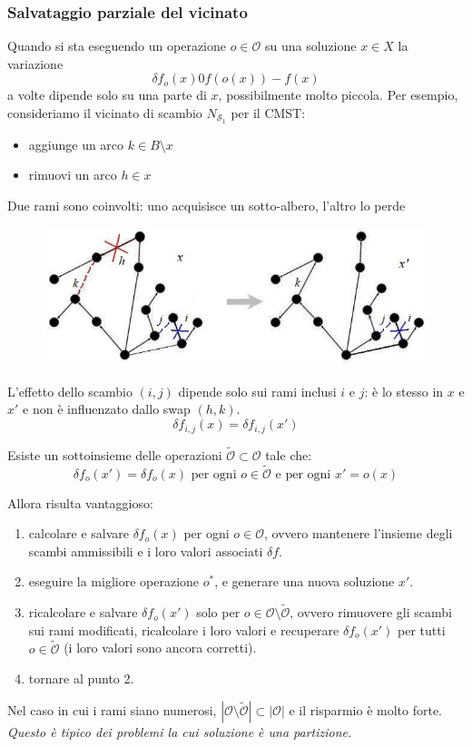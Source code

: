 \documentclass{article}
\begin{document}
\subsubsection{Salvataggio parziale del vicinato}
Quando si sta eseguendo un operazione $o\in\mathcal{O}$ su una soluzione $x\in X$ la variazione
$$\delta f_o(x)0f(o(x))-f(x)$$
a volte dipende solo su una parte di $x$, possibilmente molto piccola.
Per esempio, consideriamo il vicinato di scambio $N_{\mathcal{S}_1}$ per il CMST:
\begin{itemize}
    \item aggiunge un arco $k\in B\setminus x$
    \item rimuovi un arco $h\in x$
\end{itemize}
Due rami sono coinvolti: uno acquisisce un sotto-albero, l'altro lo perde
\begin{figure}[H]
    \centering
    \includegraphics[scale=0.6]{images/lez14_5.png}
\end{figure}
L'effetto dello scambio $(i,j)$ dipende solo sui rami inclusi $i$ e $j$: è lo stesso in $x$
e $x'$ e non è influenzato dallo swap $(h,k)$.
$$\delta f_{i,j}(x)=\delta f_{i,j}(x')$$

Esiste un sottoinsieme delle operazioni $\tilde{\mathcal{O}}\subset\mathcal{O}$ tale che:
$$\delta f_o(x')=\delta f_o(x)\text{ per ogni }o\in\tilde{\mathcal{O}}\text{ e per ogni }x'=o(x)$$

Allora risulta vantaggioso:
\begin{enumerate}
    \item calcolare e salvare $\delta f_o(x)$ per ogni $o\in\mathcal{O}$, ovvero mantenere
    l'insieme degli scambi ammissibili e i loro valori associati $\delta f$.

    \item eseguire la migliore operazione $o^*$, e generare una nuova soluzione $x'$.
    \item ricalcolare e salvare $\delta f_o(x')$ solo per $o\in\mathcal{O}\setminus\tilde{\mathcal{O}}$,
    ovvero rimuovere gli scambi sui rami modificati, ricalcolare i loro valori e recuperare
    $\delta f_o(x')$ per tutti $o\in\tilde{\mathcal{O}}$ (i loro valori sono ancora corretti).
    \item tornare al punto 2.
\end{enumerate}
Nel caso in cui i rami siano numerosi, $|\mathcal{O}\setminus\tilde{\mathcal{O}}|\subset|\mathcal{O}|$
e il risparmio è molto forte. \textit{Questo è tipico dei problemi la cui soluzione è una partizione.}
\end{document}
